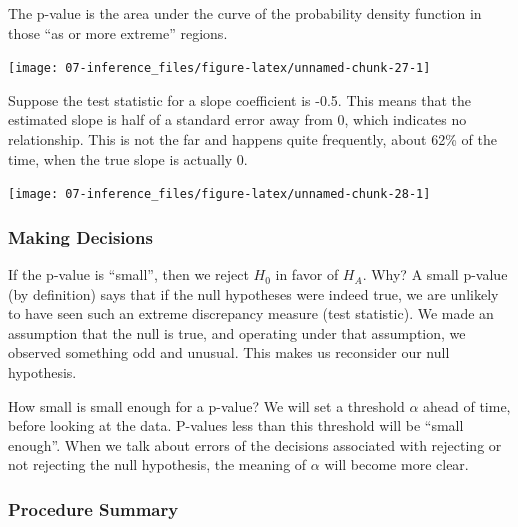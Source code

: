 \documentclass[
]{book}
\begin{document}
The p-value is the area under the curve of the probability density function in those ``as or more extreme'' regions.

\begin{center}\texttt{[image: 07-inference\_files/figure-latex/unnamed-chunk-27-1]} \end{center}

Suppose the test statistic for a slope coefficient is -0.5. This means that the estimated slope is half of a standard error away from 0, which indicates no relationship. This is not the far and happens quite frequently, about 62\% of the time, when the true slope is actually 0.

\begin{center}\texttt{[image: 07-inference\_files/figure-latex/unnamed-chunk-28-1]} \end{center}

\hypertarget{making-decisions}{%
\subsubsection{Making Decisions}\label{making-decisions}}

If the p-value is ``small'', then we reject \(H_0\) in favor of \(H_A\). Why? A small p-value (by definition) says that if the null hypotheses were indeed true, we are unlikely to have seen such an extreme discrepancy measure (test statistic). We made an assumption that the null is true, and operating under that assumption, we observed something odd and unusual. This makes us reconsider our null hypothesis.

How small is small enough for a p-value? We will set a threshold \(\alpha\) ahead of time, before looking at the data. P-values less than this threshold will be ``small enough''. When we talk about errors of the decisions associated with rejecting or not rejecting the null hypothesis, the meaning of \(\alpha\) will become more clear.

\hypertarget{procedure-summary}{%
\subsubsection{Procedure Summary}\label{procedure-summary}}
\end{document}
